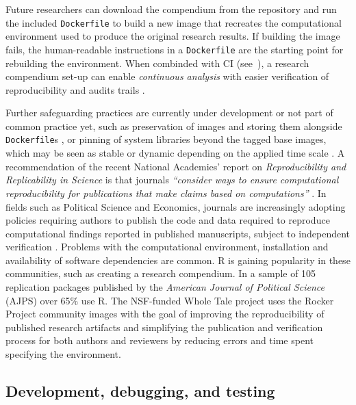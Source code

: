 Future researchers can download the compendium from the repository and
run the included \texttt{Dockerfile} to build a new image that recreates
the computational environment used to produce the original research
results. If building the image fails, the human-readable instructions in
a \texttt{Dockerfile} are the starting point for rebuilding the
environment. When combinded with CI (see~), a research
compendium set-up can enable \emph{continuous analysis} with easier
verification of reproducibility and audits trails
\citep{beaulieu-jones_reproducibility_2017}.

Further safeguarding practices are currently under development or not
part of common practice yet, such as preservation of images
\citep{emsley_framework_2018} and storing them alongside
\texttt{Dockerfile}s \citep[cf.][]{nust_opening_2017}, or pinning of
system libraries beyond the tagged base images, which may be seen as
stable or dynamic depending on the applied time scale
\citep[see discussion on `debian:testing` base image in][]{RJ-2017-065}.
A recommendation of the recent National Academies' report on
\emph{Reproducibility and Replicability in Science} is that journals
\emph{``consider ways to ensure computational reproducibility for
publications that make claims based on computations''}
\citep{NASEM2019}. In fields such as Political Science and Economics,
journals are increasingly adopting policies requiring authors to publish
the code and data required to reproduce computational findings reported
in published manuscripts, subject to independent verification
\citep{Jacoby2017,Vilhuber2019,Alvarez2018,Christian2018,Eubank2016,King1995}.
Problems with the computational environment, installation and
availability of software dependencies are common. R is gaining
popularity in these communities, such as creating a research compendium.
In a sample of 105 replication packages published by the \emph{American
Journal of Political Science} (AJPS) over 65\% use R. The NSF-funded
Whole Tale project uses the Rocker Project community images with the
goal of improving the reproducibility of published research artifacts
and simplifying the publication and verification process for both
authors and reviewers by reducing errors and time spent specifying the
environment.

\hypertarget{development-debugging-and-testing}{%
\subsection{Development, debugging, and
testing}\label{development-debugging-and-testing}}

